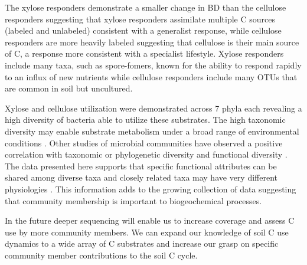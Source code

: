 The xylose responders demonstrate a smaller change in BD than the
cellulose responders suggesting that xylose responders assimilate multiple C
sources (labeled and unlabeled) consistent with a generalist response, while
cellulose responders are more heavily labeled suggesting that cellulose is
their main source of C, a response more consistent with a specialist lifestyle.
Xylose responders include many taxa, such as spore-fomers, known for the
ability to respond rapidly to an influx of new nutrients while cellulose
responders include many OTUs that are common in soil but uncultured.
 
Xylose and cellulose utilization were demonstrated across 7 phyla each
revealing a high diversity of bacteria able to utilize these substrates. The
high taxonomic diversity may enable substrate metabolism under a broad range of
environmental conditions \citep{Goldfarb_2011}. Other studies of microbial
communities have observed a positive correlation with taxonomic or phylogenetic
diversity and functional diversity
\citep{Fierer_2012,Fierer_2013,Philippot_2010,Tringe_2005,Gilbert_2010,Bryant_2012}.
The data presented here supports that specific functional attributes can be
shared among diverse taxa and closely related taxa may have very different
physiologies \citep{Fierer_2012,Philippot_2010}. This information adds to the
growing collection of data suggesting that community membership is important to
biogeochemical processes.

In the future deeper sequencing will enable us to increase coverage and assess
C use by more community members. We can expand our knowledge
of soil C use dynamics to a wide array of C substrates and increase our grasp
on specific community member contributions to the soil C cycle.
